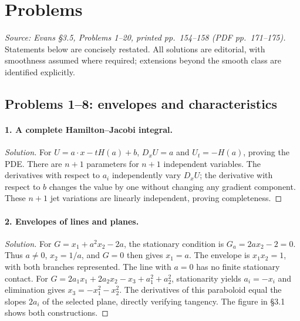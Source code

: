 \Needspace{65mm}
\section{Problems}
\label{sec:3-5}

\noindent\textit{Source: Evans \S3.5, Problems 1--20, printed pp.~154--158
(PDF pp.~171--175).} Statements below are concisely restated.
All solutions are editorial, with smoothness assumed where required;
extensions beyond the smooth class are identified explicitly.

\subsection{Problems 1--8: envelopes and characteristics}
\Needspace{30mm}
\paragraph{1. A complete Hamilton--Jacobi integral.}
\begin{proof}[Solution]
For $U=a\cdot x-tH(a)+b$, $D_xU=a$ and $U_t=-H(a)$, proving the PDE.
There are $n+1$ parameters for $n+1$ independent variables.
The derivatives with respect to $a_i$ independently vary $D_xU$;
the derivative with respect to $b$ changes the value by one without
changing any gradient component.
These $n+1$ jet variations are linearly independent, proving completeness.
\end{proof}

\Needspace{30mm}
\paragraph{2. Envelopes of lines and planes.}
\begin{proof}[Solution]
For $G=x_1+a^2x_2-2a$, the stationary condition is $G_a=2ax_2-2=0$.
Thus $a\ne0$, $x_2=1/a$, and $G=0$ then gives $x_1=a$.
The envelope is $x_1x_2=1$, with both branches represented.
The line with $a=0$ has no finite stationary contact.
For $G=2a_1x_1+2a_2x_2-x_3+a_1^2+a_2^2$,
stationarity yields $a_i=-x_i$ and elimination gives
$x_3=-x_1^2-x_2^2$.
The derivatives of this paraboloid equal the slopes $2a_i$ of the
selected plane, directly verifying tangency. The figure in \S3.1
shows both constructions.
\end{proof}

